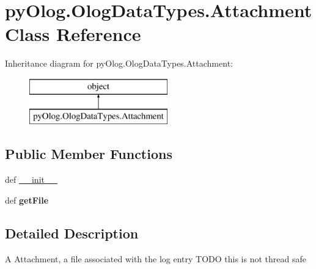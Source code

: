 \hypertarget{classpyOlog_1_1OlogDataTypes_1_1Attachment}{\section{py\-Olog.\-Olog\-Data\-Types.\-Attachment Class Reference}
\label{classpyOlog_1_1OlogDataTypes_1_1Attachment}
}
Inheritance diagram for py\-Olog.\-Olog\-Data\-Types.\-Attachment\-:\begin{figure}[H]
\begin{center}
\leavevmode
\includegraphics[height=2.000000cm]{classpyOlog_1_1OlogDataTypes_1_1Attachment}
\end{center}
\end{figure}
\subsection*{Public Member Functions}
\begin{DoxyCompactItemize}
\item 
def \hyperlink{classpyOlog_1_1OlogDataTypes_1_1Attachment_adee39c9ec988dcc8edc84109fb8ffa9d}{\-\_\-\-\_\-init\-\_\-\-\_\-}
\item 
\hypertarget{classpyOlog_1_1OlogDataTypes_1_1Attachment_a08d8430ba6e93b4ca662ff13f13d0fae}{def {\bfseries get\-File}}\label{classpyOlog_1_1OlogDataTypes_1_1Attachment_a08d8430ba6e93b4ca662ff13f13d0fae}

\end{DoxyCompactItemize}


\subsection{Detailed Description}
\begin{DoxyVerb}A Attachment, a file associated with the log entry
TODO this is not thread safe    
\end{DoxyVerb}
 

